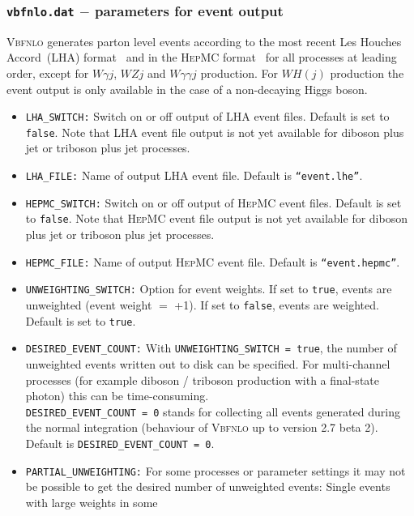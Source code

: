 \documentclass[english,12pt]{article}
\begin{document}
\subsubsection{{\tt vbfnlo.dat} $-$ parameters for event output}
\label{sec:lha}
\textsc{Vbfnlo} generates parton level events according to the most
recent Les Houches Accord~(LHA) format~\cite{Alwall:2006yp} and in the
\textsc{HepMC} format~\cite{Dobbs:2001ck} for all processes at leading order,
except for $W\gamma j$, $WZj$ and $W\gamma\gamma j$ production.
For $WH(j)$ production the event output is only available in the case of
a non-decaying Higgs boson.
\begin{itemize}
\item {\tt LHA\_SWITCH:} Switch on or off output of LHA event files. Default is
set to {\tt false}.   Note that LHA event file output is not yet available for
diboson plus jet or triboson plus jet processes.
\item {\tt LHA\_FILE:} Name of output LHA event file.  Default is {\tt ``event.lhe''}.
\item {\tt HEPMC\_SWITCH:} Switch on or off output of \textsc{HepMC} event files. Default is
set to {\tt false}.   Note that \textsc{HepMC} event file output is not yet available for
diboson plus jet or triboson plus jet processes.
\item {\tt HEPMC\_FILE:} Name of output \textsc{HepMC} event file.  Default is
{\tt ``event.hepmc''}.
\item {\tt UNWEIGHTING\_SWITCH:} Option for event weights. If set to {\tt true}, 
  events are unweighted
  (event weight $=$ +1). If set to {\tt false}, events are weighted.  Default is set 
  to {\tt true}.
\item {\tt DESIRED\_EVENT\_COUNT:} With {\tt UNWEIGHTING\_SWITCH = true}, the number of
  unweighted events written out to disk can be specified. For multi-channel processes 
  (for example diboson / triboson production with a final-state photon) this can be
  time-consuming.\\
  {\tt DESIRED\_EVENT\_COUNT = 0} stands for collecting all events generated during the
  normal integration (behaviour of \textsc{Vbfnlo} up to version 2.7 beta 2).\\
  Default is {\tt DESIRED\_EVENT\_COUNT = 0}.
\item {\tt PARTIAL\_UNWEIGHTING:} For some processes or parameter settings it may not be possible
  to get the desired number of unweighted events: Single events with large weights in some

\end{itemize}
\end{document}
